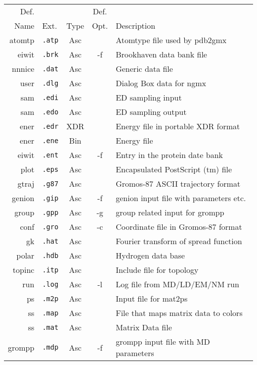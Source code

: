 \begin{table}[p]
\begin{tabularx}{\linewidth}{rlccX}
\hline
   Def. &       &      &  Def. & \\
   Name &  Ext. & Type &  Opt. & Description \\
\hline
 atomtp & {\tt .atp} & Asc &    & Atomtype file used by pdb2gmx \\
  eiwit & {\tt .brk} & Asc & -f & Brookhaven data bank file \\
 nnnice & {\tt .dat} & Asc &    & Generic data file \\
   user & {\tt .dlg} & Asc &    & Dialog Box data for ngmx \\
    sam & {\tt .edi} & Asc &    & ED sampling input \\
    sam & {\tt .edo} & Asc &    & ED sampling output \\
   ener & {\tt .edr} & XDR &    & Energy file in portable XDR format \\
   ener & {\tt .ene} & Bin &    & Energy file \\
  eiwit & {\tt .ent} & Asc & -f & Entry in the protein date bank \\
   plot & {\tt .eps} & Asc &    & Encapsulated PostScript (tm) file \\
  gtraj & {\tt .g87} & Asc &    & Gromos-87 ASCII trajectory format \\
 genion & {\tt .gip} & Asc & -f & genion input file with parameters etc. \\
  group & {\tt .gpp} & Asc & -g & group related input for grompp \\
   conf & {\tt .gro} & Asc & -c & Coordinate file in Gromos-87 format \\
     gk & {\tt .hat} & Asc &    & Fourier transform of spread function \\
  polar & {\tt .hdb} & Asc &    & Hydrogen data base \\
 topinc & {\tt .itp} & Asc &    & Include file for topology \\
    run & {\tt .log} & Asc & -l & Log file from MD/LD/EM/NM run \\
     ps & {\tt .m2p} & Asc &    & Input file for mat2ps \\
     ss & {\tt .map} & Asc &    & File that maps matrix data to colors \\
     ss & {\tt .mat} & Asc &    & Matrix Data file \\
 grompp & {\tt .mdp} & Asc & -f & grompp input file with MD parameters \\

\end{tabularx}
\end{table}
